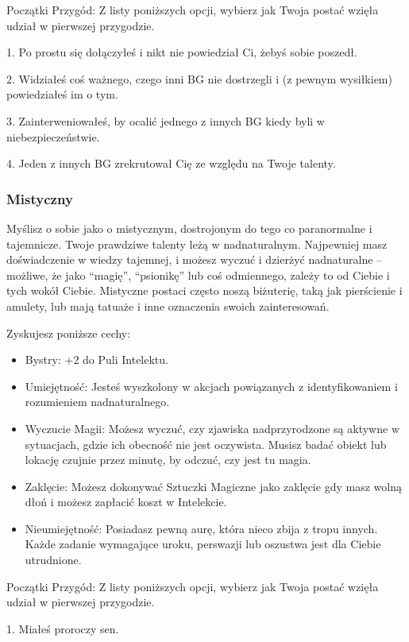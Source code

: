 Początki Przygód: Z listy poniższych opcji, wybierz jak Twoja postać wzięła udział w pierwszej przygodzie.

1. Po prostu się dołączyłeś i nikt nie powiedział Ci, żebyś sobie poszedł.

2. Widziałeś coś ważnego, czego inni BG nie dostrzegli i (z pewnym wysiłkiem) powiedziałeś im o tym.

3. Zainterweniowałeś, by ocalić jednego z innych BG kiedy byli w niebezpieczeństwie.

4. Jeden z innych BG zrekrutował Cię ze względu na Twoje talenty.

\subsubsection{Mistyczny}

Myślisz o sobie jako o mistycznym, dostrojonym do tego co paranormalne i tajemnicze. Twoje prawdziwe talenty leżą w nadnaturalnym.  Najpewniej masz doświadczenie w wiedzy tajemnej, i możesz wyczuć i dzierżyć nadnaturalne – możliwe, że jako “magię”, “psionikę” lub coś odmiennego, zależy to od Ciebie i tych wokół Ciebie. Mistyczne postaci często noszą biżuterię, taką jak pierścienie i amulety, lub mają tatuaże i inne oznaczenia swoich zainteresowań.

Zyskujesz poniższe cechy:
\begin{itemize}
\item  Bystry: +2 do Puli Intelektu.
\item  Umiejętność: Jesteś wyszkolony w akcjach powiązanych z identyfikowaniem i rozumieniem nadnaturalnego.
\item  Wyczucie Magii: Możesz wyczuć, czy zjawiska nadprzyrodzone są aktywne w sytuacjach, gdzie ich obecność nie jest oczywista. Musisz badać obiekt lub lokację czujnie przez minutę, by odczuć, czy jest tu magia. 
\item  Zaklęcie: Możesz dokonywać Sztuczki Magiczne jako zaklęcie gdy masz wolną dłoń i możesz zapłacić koszt w Intelekcie. 
 \item Nieumiejętność: Posiadasz pewną aurę, która nieco zbija z tropu innych. Każde zadanie wymagające uroku, perswazji lub oszustwa jest dla Ciebie utrudnione. 
\end{itemize}

Początki Przygód: Z listy poniższych opcji, wybierz jak Twoja postać wzięła udział w pierwszej przygodzie.

1. Miałeś proroczy sen.

